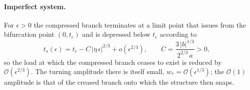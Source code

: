 \paragraph{Imperfect system.}
\begin{proposition}
    \label{prop:koiter}
    For $\epsilon>0$ the compressed branch terminates at a limit point that issues from the bifurcation point
    $(0,t_c)$ and is depressed below $t_c$ according to
    \begin{equation}
        \label{eq:koiter}
        t_s(\epsilon) = t_c - C\,|\eta\,\epsilon|^{2/3} + o(\epsilon^{2/3}), \qquad
        C=\frac{3\,|b|^{1/3}}{2^{2/3}\,a}>0,
    \end{equation}
    so the load at which the compressed branch ceases to exist is reduced by $\mathcal{O}(\epsilon^{2/3})$. The
    turning amplitude there is itself small, $w_\ast=\mathcal{O}(\epsilon^{1/3})$; the $\mathcal{O}(1)$ amplitude is
    that of the creased branch onto which the structure then snaps.
\end{proposition}
